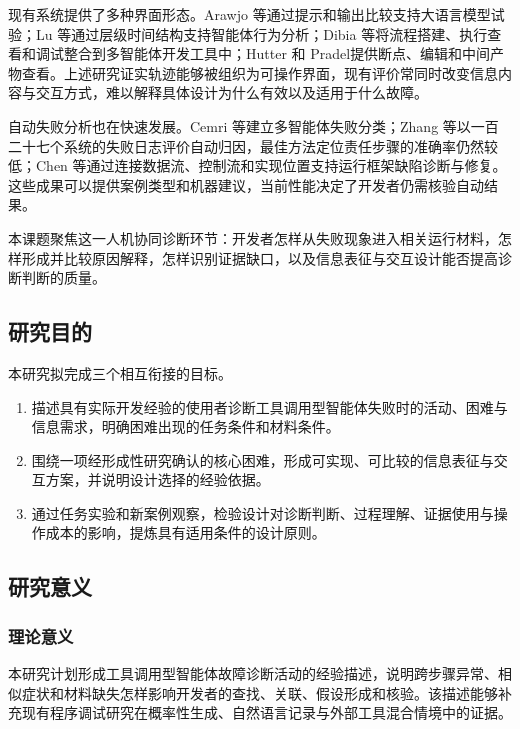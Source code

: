 现有系统提供了多种界面形态。Arawjo 等\cite{arawjo2024chainforge}通过提示和输出比较支持大语言模型试验；Lu 等\cite{ref22}通过层级时间结构支持智能体行为分析；Dibia 等\cite{ref25}将流程搭建、执行查看和调试整合到多智能体开发工具中；Hutter 和 Pradel\cite{ref18}提供断点、编辑和中间产物查看。上述研究证实轨迹能够被组织为可操作界面，现有评价常同时改变信息内容与交互方式，难以解释具体设计为什么有效以及适用于什么故障。

自动失败分析也在快速发展。Cemri 等\cite{cemri2025mast}建立多智能体失败分类；Zhang 等\cite{ref03}以一百二十七个系统的失败日志评价自动归因，最佳方法定位责任步骤的准确率仍然较低；Chen 等\cite{ref20}通过连接数据流、控制流和实现位置支持运行框架缺陷诊断与修复。这些成果可以提供案例类型和机器建议，当前性能决定了开发者仍需核验自动结果。

本课题聚焦这一人机协同诊断环节：开发者怎样从失败现象进入相关运行材料，怎样形成并比较原因解释，怎样识别证据缺口，以及信息表征与交互设计能否提高诊断判断的质量。

\subsection{研究目的}

本研究拟完成三个相互衔接的目标。

\begin{enumerate}
  \item 描述具有实际开发经验的使用者诊断工具调用型智能体失败时的活动、困难与信息需求，明确困难出现的任务条件和材料条件。
  \item 围绕一项经形成性研究确认的核心困难，形成可实现、可比较的信息表征与交互方案，并说明设计选择的经验依据。
  \item 通过任务实验和新案例观察，检验设计对诊断判断、过程理解、证据使用与操作成本的影响，提炼具有适用条件的设计原则。
\end{enumerate}

\subsection{研究意义}

\subsubsection{理论意义}

本研究计划形成工具调用型智能体故障诊断活动的经验描述，说明跨步骤异常、相似症状和材料缺失怎样影响开发者的查找、关联、假设形成和核验。该描述能够补充现有程序调试研究在概率性生成、自然语言记录与外部工具混合情境中的证据。

